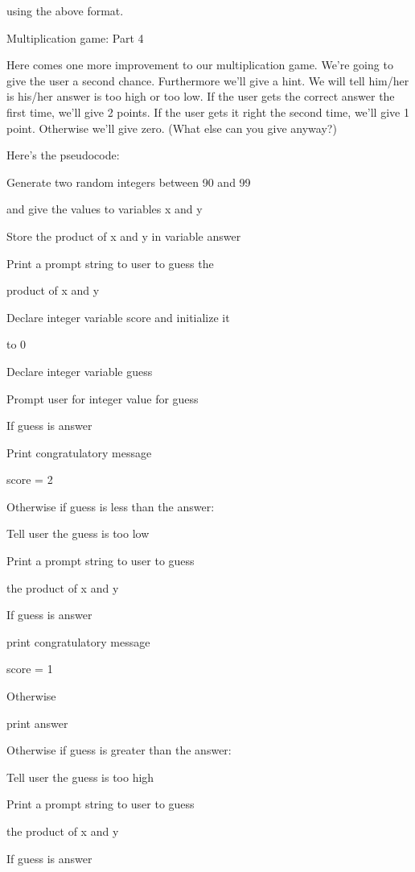 \documentclass[
]{article}
\begin{document}
\begin{longtable}[]{@{}@{}}
\toprule
\endhead
\bottomrule
\end{longtable}

using the above format.

Multiplication game: Part 4

Here comes one more improvement to our multiplication game. We're going
to give the user a second chance. Furthermore we'll give a hint. We will
tell him/her is his/her answer is too high or too low. If the user gets
the correct answer the first time, we'll give 2 points. If the user gets
it right the second time, we'll give 1 point. Otherwise we'll give zero.
(What else can you give anyway?)

Here's the pseudocode:

Generate two random integers between 90 and 99

and give the values to variables x and y

Store the product of x and y in variable answer

Print a prompt string to user to guess the

product of x and y

Declare integer variable score and initialize it

to 0

Declare integer variable guess

Prompt user for integer value for guess

If guess is answer

Print congratulatory message

score = 2

Otherwise if guess is less than the answer:

Tell user the guess is too low

Print a prompt string to user to guess

the product of x and y

If guess is answer

print congratulatory message

score = 1

Otherwise

print answer

Otherwise if guess is greater than the answer:

Tell user the guess is too high

Print a prompt string to user to guess

the product of x and y

If guess is answer
\end{document}
